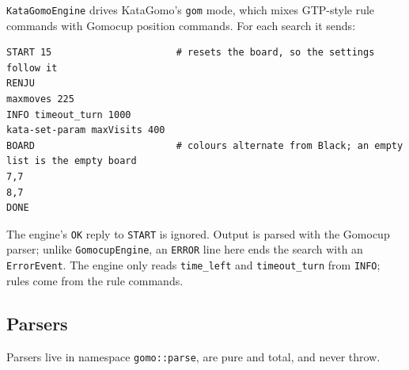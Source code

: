 \documentclass[11pt,a4paper]{article}
\newcommand{\code}[1]{\texttt{#1}}
\begin{document}
\code{KataGomoEngine} drives KataGomo's \code{gom} mode, which mixes GTP-style rule commands with
Gomocup position commands. For each search it sends:

\begin{lstlisting}[style=sh]
START 15                      # resets the board, so the settings follow it
RENJU
maxmoves 225
INFO timeout_turn 1000
kata-set-param maxVisits 400
BOARD                         # colours alternate from Black; an empty list is the empty board
7,7
8,7
DONE
\end{lstlisting}

\noindent The engine's \code{OK} reply to \code{START} is ignored. Output is parsed with the Gomocup
parser; unlike \code{GomocupEngine}, an \code{ERROR} line here ends the search with an
\code{ErrorEvent}. The engine only reads \code{time\_left} and \code{timeout\_turn} from \code{INFO};
rules come from the rule commands.

\subsection{Parsers}

Parsers live in namespace \code{gomo::parse}, are pure and total, and never throw.
\end{document}
